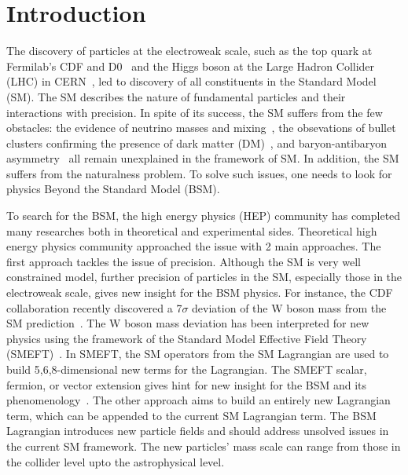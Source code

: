 \chapter{Introduction}\label{sec:introduction}

The discovery of particles at the electroweak scale, such as the top quark at Fermilab's CDF and D0~\cite{topD0,topCDF} and the Higgs boson at the Large Hadron Collider (LHC) in CERN~\cite{higgscms,higgsatlas}, led to discovery of all constituents in the Standard Model (SM). 
The SM describes the nature of fundamental particles and their interactions with precision. 
In spite of its success, the SM suffers from the few obstacles:
the evidence of neutrino masses and mixing~\cite{neutrino}, the obsevations of bullet clusters confirming the presence of dark matter (DM)~\cite{Baumgart:2009tn,Kaplan:2009ag,Chan:2011aa,Dienes:2011ja,Dienes:2012yz}, and baryon-antibaryon asymmetry~\cite{Cui:2014twa} all remain unexplained in the framework of SM. 
In addition, the SM suffers from the naturalness problem. 
To solve such issues, one needs to look for physics Beyond the Standard Model (BSM).

To search for the BSM, the high energy physics (HEP) community has completed many researches both in theoretical and experimental sides. 
Theoretical high energy physics community approached the issue with 2 main approaches. 
The first approach tackles the issue of precision. 
Although the SM is very well constrained model, further precision of particles in the SM, especially those in the electroweak scale, gives new insight for the BSM physics.
For instance, the CDF collaboration recently discovered a 7$\sigma$ deviation of the W boson mass from the SM prediction~\cite{Aaltonen:2022aaa}. 
The W boson mass deviation has been interpreted for new physics using the framework of the Standard Model Effective Field Theory (SMEFT)~\cite{Mishima:2022aab}.
In SMEFT, the SM operators from the SM Lagrangian are used to build 5,6,8-dimensional new terms for the Lagrangian. 
The SMEFT scalar, fermion, or vector extension gives hint for new insight for the BSM and its phenomenology~\cite{Mishima:2022aab}.
The other approach aims to build an entirely new Lagrangian term, which can be appended to the current SM Lagrangian term. 
The BSM Lagrangian introduces new particle fields and should address unsolved issues in the current SM framework.
The new particles' mass scale can range from those in the collider level upto the astrophysical level.

